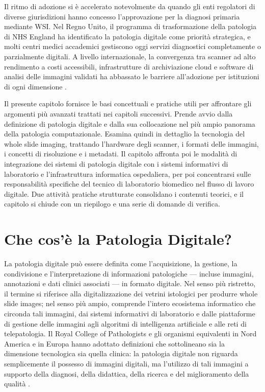 Il ritmo di adozione si è accelerato notevolmente da quando gli enti regolatori di diverse giurisdizioni hanno concesso l'approvazione per la diagnosi primaria mediante WSI. Nel Regno Unito, il programma di trasformazione della patologia di NHS England ha identificato la patologia digitale come priorità strategica, e molti centri medici accademici gestiscono oggi servizi diagnostici completamente o parzialmente digitali. A livello internazionale, la convergenza tra scanner ad alto rendimento a costi accessibili, infrastrutture di archiviazione cloud e software di analisi delle immagini validati ha abbassato le barriere all'adozione per istituzioni di ogni dimensione \cite{song2023}.

Il presente capitolo fornisce le basi concettuali e pratiche utili per  affrontare gli argomenti più avanzati trattati nei capitoli successivi. Prende avvio dalla definizione di patologia digitale e dalla sua collocazione nel più ampio panorama della patologia computazionale. Esamina quindi in dettaglio la tecnologia del whole slide imaging, trattando l'hardware degli scanner, i formati delle immagini, i concetti di risoluzione e i metadati. Il capitolo affronta poi le modalità di integrazione dei sistemi di patologia digitale con i sistemi informativi di laboratorio e l'infrastruttura informatica ospedaliera, per poi concentrarsi sulle responsabilità specifiche del tecnico di laboratorio biomedico nel flusso di lavoro digitale. Due attività pratiche strutturate consolidano i contenuti teorici, e il capitolo si chiude con un riepilogo e una serie di domande di verifica.

\section{Che cos'è la Patologia Digitale?}

La patologia digitale può essere definita come l'acquisizione, la gestione, la condivisione e l'interpretazione di informazioni patologiche --- incluse immagini, annotazioni e dati clinici associati --- in formato digitale. Nel senso più ristretto, il termine si riferisce alla digitalizzazione dei vetrini istologici per produrre whole slide images; nel senso più ampio, comprende l'intero ecosistema informatico che circonda tali immagini, dai sistemi informativi di laboratorio e dalle piattaforme di gestione delle immagini agli algoritmi di intelligenza artificiale e alle reti di telepatologia. Il Royal College of Pathologists e gli organismi equivalenti in Nord America e in Europa hanno adottato definizioni che sottolineano sia la dimensione tecnologica sia quella clinica: la patologia digitale non riguarda semplicemente il possesso di immagini digitali, ma l'utilizzo di tali immagini a supporto della diagnosi, della didattica, della ricerca e del miglioramento della qualità \cite{bankhead2022}.

